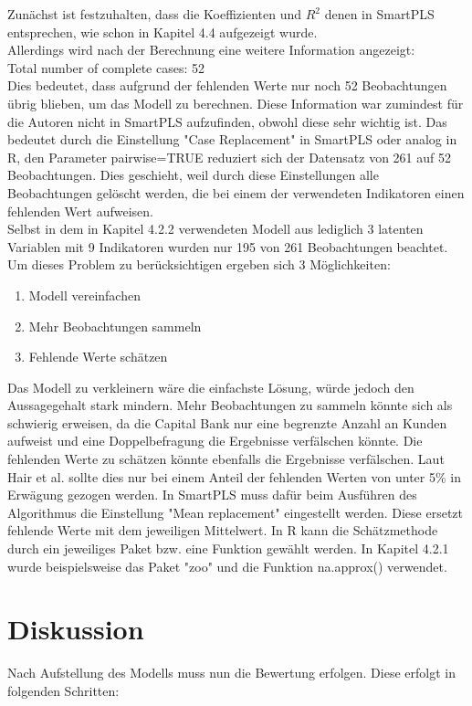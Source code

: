\documentclass{article}\usepackage[]{graphicx}\usepackage[]{color}
\begin{document}
Zunächst ist festzuhalten, dass die Koeffizienten und $R^{2}$ denen in SmartPLS entsprechen, wie schon in Kapitel 4.4 aufgezeigt wurde. \\
Allerdings wird nach der Berechnung eine weitere Information angezeigt:\\
Total number of complete cases: 52\\
Dies bedeutet, dass aufgrund der fehlenden Werte nur noch 52 Beobachtungen übrig blieben, um das Modell zu berechnen. Diese Information war zumindest für die Autoren nicht in SmartPLS aufzufinden, obwohl diese sehr wichtig ist. Das bedeutet durch die Einstellung "Case Replacement" in SmartPLS oder analog in R, den Parameter pairwise=TRUE reduziert sich der Datensatz von 261 auf 52 Beobachtungen. Dies geschieht, weil durch diese Einstellungen alle Beobachtungen gelöscht werden, die bei einem der verwendeten Indikatoren einen fehlenden Wert aufweisen.\\
Selbst in dem in Kapitel 4.2.2 verwendeten Modell aus lediglich 3 latenten Variablen mit 9 Indikatoren wurden nur 195 von 261 Beobachtungen beachtet.\\
Um dieses Problem zu berücksichtigen ergeben sich 3 Möglichkeiten:
\begin{enumerate}
\item Modell vereinfachen
\item Mehr Beobachtungen sammeln
\item Fehlende Werte schätzen
\end{enumerate}
Das Modell zu verkleinern wäre die einfachste Lösung, würde jedoch den Aussagegehalt stark mindern. Mehr Beobachtungen zu sammeln könnte sich als schwierig erweisen, da die Capital Bank nur eine begrenzte Anzahl an Kunden aufweist und eine Doppelbefragung die Ergebnisse verfälschen könnte. Die fehlenden Werte zu schätzen könnte ebenfalls die Ergebnisse verfälschen. Laut Hair et al.\cite{hair2013primer} sollte dies nur bei einem Anteil der fehlenden Werten von unter 5\% in Erwägung gezogen werden. In SmartPLS muss dafür beim Ausführen des Algorithmus die Einstellung "Mean replacement" eingestellt werden. Diese ersetzt fehlende Werte mit dem jeweiligen Mittelwert. In R kann die Schätzmethode durch ein jeweiliges Paket bzw. eine Funktion gewählt werden. In Kapitel 4.2.1 wurde beispielsweise das Paket "zoo" und die Funktion na.approx() verwendet.






\section{Diskussion}%
Nach Aufstellung des Modells muss nun die Bewertung erfolgen. Diese erfolgt in folgenden Schritten:
\end{document}
